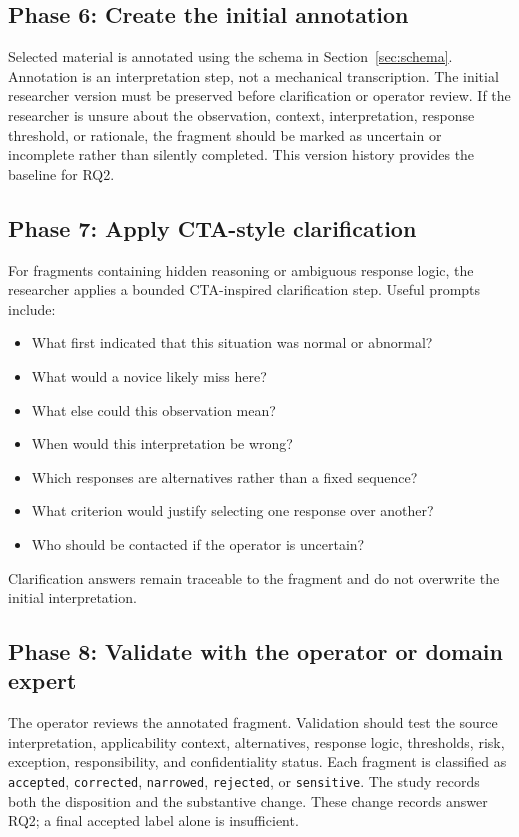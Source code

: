 \subsection{Phase 6: Create the initial annotation}

Selected material is annotated using the schema in Section~\ref{sec:schema}. Annotation is an interpretation step, not a mechanical transcription. The initial researcher version must be preserved before clarification or operator review. If the researcher is unsure about the observation, context, interpretation, response threshold, or rationale, the fragment should be marked as uncertain or incomplete rather than silently completed. This version history provides the baseline for RQ2.

\subsection{Phase 7: Apply CTA-style clarification}

For fragments containing hidden reasoning or ambiguous response logic, the researcher applies a bounded CTA-inspired clarification step. Useful prompts include:

\begin{itemize}
    \item What first indicated that this situation was normal or abnormal?
    \item What would a novice likely miss here?
    \item What else could this observation mean?
    \item When would this interpretation be wrong?
    \item Which responses are alternatives rather than a fixed sequence?
    \item What criterion would justify selecting one response over another?
    \item Who should be contacted if the operator is uncertain?
\end{itemize}

Clarification answers remain traceable to the fragment and do not overwrite the initial interpretation.

\subsection{Phase 8: Validate with the operator or domain expert}

The operator reviews the annotated fragment. Validation should test the source interpretation, applicability context, alternatives, response logic, thresholds, risk, exception, responsibility, and confidentiality status. Each fragment is classified as \texttt{accepted}, \texttt{corrected}, \texttt{narrowed}, \texttt{rejected}, or \texttt{sensitive}. The study records both the disposition and the substantive change. These change records answer RQ2; a final accepted label alone is insufficient.

